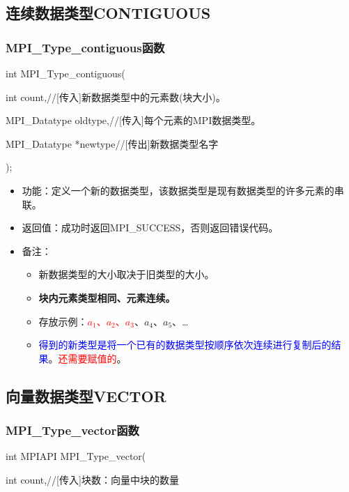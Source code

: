 \documentclass[UTF8]{article}%
\begin{document}
\subsection{连续数据类型CONTIGUOUS}

\subsubsection{MPI\_Type\_contiguous函数}

int MPI\_Type\_contiguous(

    \qquad int           count,//[传入]新数据类型中的元素数(块大小)。

    \qquad MPI\_Datatype oldtype,//[传入]每个元素的MPI数据类型。

    \qquad MPI\_Datatype *newtype//[传出]新数据类型名字

);

\begin{itemize}
    \item 功能：定义一个新的数据类型，该数据类型是现有数据类型的许多元素的串联。
    \item 返回值：成功时返回MPI\_SUCCESS，否则返回错误代码。
    \item 备注：
    
    {
        \begin{itemize}
            \item 新数据类型的大小取决于旧类型的大小。
            \item \textbf{块内元素类型相同、元素连续。}
            \item 存放示例：\textcolor{red}{$a_1$、$a_2$、$a_3$}、$a_4$、$a_5$、\dots
            \item \textcolor{blue}{得到的新类型是将一个已有的数据类型按顺序依次连续进行复制后的结果}。\textcolor{red}{还需要赋值的}。
        \end{itemize}
    }

\end{itemize}

\subsection{向量数据类型VECTOR}

\subsubsection{MPI\_Type\_vector函数}

int MPIAPI MPI\_Type\_vector(

    \qquad int          count,//[传入]块数：向量中块的数量
\end{document}

